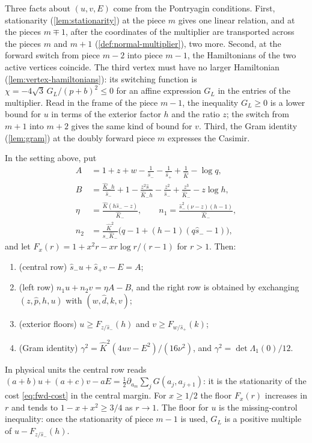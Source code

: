 Three facts about $(u,v,E)$ come from the Pontryagin conditions. First, stationarity
(\cref{lem:stationarity}) at the piece $m$ gives one linear relation, and at the pieces $m\mp1$,
after the coordinates of the multiplier are transported across the pieces $m$ and $m+1$
(\cref{def:normal-multiplier}), two more. Second, at the forward switch from piece $m-2$ into
piece $m-1$, the Hamiltonians of the two active vertices coincide. The third vertex must have no
larger Hamiltonian (\cref{lem:vertex-hamiltonians}): its switching function is
$\chi=-4\sqrt3\,G_L/(p+b)^2\le0$ for an affine expression $G_L$ in the entries of the multiplier.
Read in the frame of the piece $m-1$, the inequality $G_L\ge0$ is a lower bound for $u$ in terms
of the exterior factor $h$ and the ratio $z$; the switch from $m+1$ into $m+2$ gives the same kind
of bound for $v$. Third, the Gram identity (\cref{lem:gram}) at the doubly forward piece $m$
expresses the Casimir.

\begin{proposition}\label{prop:fwd-window}
In the setting above, put
\begin{align*}
A&=1+z+w-\frac1{\hat s_-}-\frac1{\hat s_+}+\frac1{\hat K}-\log q,\\
B&=\frac{\hat K_-h}{\hat s_-}+1-\frac{z^2\hat s_-}{\hat K_-h}-\frac{z^2}{\hat s_-}
   +\frac{z^3}{\hat K_-}-z\log h,\\
\eta&=\frac{\hat K(h\hat s_--z)}{\hat K_-},\qquad
n_1=\frac{\hat s_-^2(\nu-z)(h-1)}{\hat K_-},\\
n_2&=\frac{\hat K^2}{\hat s_-\hat K_-}\bigl(q-1+(h-1)(q\hat s_--1)\bigr),
\end{align*}
and let $F_x(r)=1+x^2r-xr\log r/(r-1)$ for $r>1$. Then:
\begin{enumerate}
\item (central row) $\hat s_-u+\hat s_+v-E=A$;
\item (left row) $n_1u+n_2v=\eta A-B$, and the right row is obtained by exchanging
  $(z,\hat p,h,u)$ with $(w,\hat d,k,v)$;
\item (exterior floors) $u\ge F_{z/\hat s_-}(h)$ and $v\ge F_{w/\hat s_+}(k)$;
\item (Gram identity) $\gamma^2=\hat K^2(4uv-E^2)/(16\nu^2)$, and $\gamma^2=\det\Lambda_1(0)/12$.
\end{enumerate}
\end{proposition}

In physical units the central row reads $(a+b)u+(a+c)v-aE=\frac12\partial_{a_m}\sum_jG(a_j,a_{j+1})$:
it is the stationarity of the cost \eqref{eq:fwd-cost} in the central margin. For $x\ge1/2$ the
floor $F_x(r)$ increases in $r$ and tends to $1-x+x^2\ge3/4$ as $r\to1$. The floor for $u$ is the
missing-control inequality: once the stationarity of piece $m-1$ is used, $G_L$ is a positive multiple of
$u-F_{z/\hat s_-}(h)$.

